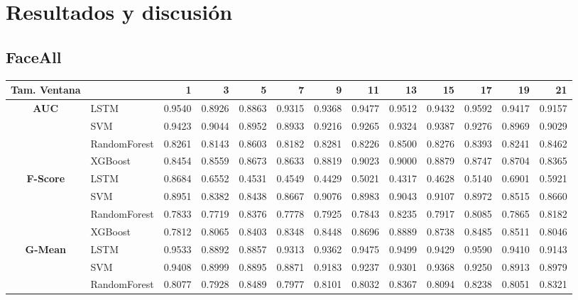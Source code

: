 \chapter{Resultados y discusión}
\section{FaceAll}
\begin{table}[h]
\begin{adjustbox}{max width=16cm}
\centering
\begin{tabular}{|c|l|r|r|r|r|r|r|r|r|r|r|r|}
	\hline
	\textbf{Tam. Ventana}
	&         &      1  &      3  &      5  &      7  &      9  &      11 &      13 &      15 &      17 &      19 &      21 \\
	\hline
	\textbf{AUC} & LSTM &  0.9540 &  0.8926 &  0.8863 &  0.9315 &  0.9368 &  0.9477 &  0.9512 &  0.9432 &  0.9592 &  0.9417 &  0.9157 \\
	& SVM &  0.9423 &  0.9044 &  0.8952 &  0.8933 &  0.9216 &  0.9265 &  0.9324 &  0.9387 &  0.9276 &  0.8969 &  0.9029 \\
	& RandomForest &  0.8261 &  0.8143 &  0.8603 &  0.8182 &  0.8281 &  0.8226 &  0.8500 &  0.8276 &  0.8393 &  0.8241 &  0.8462 \\
	& XGBoost &  0.8454 &  0.8559 &  0.8673 &  0.8633 &  0.8819 &  0.9023 &  0.9000 &  0.8879 &  0.8747 &  0.8704 &  0.8365 \\
	\hline
	\textbf{F-Score} & LSTM &  0.8684 &  0.6552 &  0.4531 &  0.4549 &  0.4429 &  0.5021 &  0.4317 &  0.4628 &  0.5140 &  0.6901 &  0.5921 \\
	& SVM &  0.8951 &  0.8382 &  0.8438 &  0.8667 &  0.9076 &  0.8983 &  0.9043 &  0.9107 &  0.8972 &  0.8515 &  0.8660 \\
	& RandomForest &  0.7833 &  0.7719 &  0.8376 &  0.7778 &  0.7925 &  0.7843 &  0.8235 &  0.7917 &  0.8085 &  0.7865 &  0.8182 \\
	& XGBoost &  0.7812 &  0.8065 &  0.8403 &  0.8348 &  0.8448 &  0.8696 &  0.8889 &  0.8738 &  0.8485 &  0.8511 &  0.8046 \\
	\hline
	\textbf{G-Mean} & LSTM &  0.9533 &  0.8892 &  0.8857 &  0.9313 &  0.9362 &  0.9475 &  0.9499 &  0.9429 &  0.9590 &  0.9410 &  0.9143 \\
	& SVM &  0.9408 &  0.8999 &  0.8895 &  0.8871 &  0.9183 &  0.9237 &  0.9301 &  0.9368 &  0.9250 &  0.8913 &  0.8979 \\
	& RandomForest &  0.8077 &  0.7928 &  0.8489 &  0.7977 &  0.8101 &  0.8032 &  0.8367 &  0.8094 &  0.8238 &  0.8051 &  0.8321 \\

\end{tabular}
\end{adjustbox}
\end{table}
